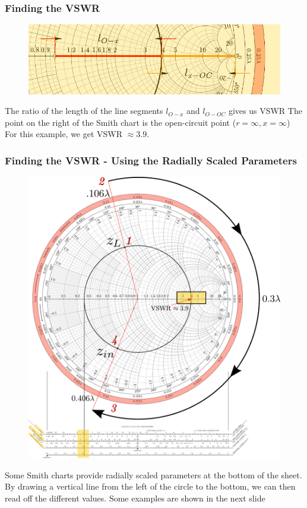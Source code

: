 \documentclass[10pt, compress]{beamer}
\begin{document}
\begin{frame}
    \frametitle{Finding the VSWR}
    \begin{figure}[T!]
        \centering
        \includegraphics[width=.95\textwidth]{smith example VSWR cropped.pdf}
    \end{figure}
    \begin{outline}
        \1 The ratio of the length of the line segments $l_{O - x}$ and $l_{O - OC}$ gives us VSWR
        \1 The point on the right of the Smith chart is the open-circuit point ($r = \infty, x = \infty$)
        \1 For this example, we get VSWR $\approx 3.9$.
    \end{outline}

\end{frame}

\begin{frame}
    \frametitle{Finding the VSWR - Using the Radially Scaled Parameters}
    \begin{figure}[T!]
        \centering
                \includegraphics[width=.50\textwidth]{smith example VSWR2.pdf}
    \end{figure}
    \begin{outline}
        \1 Some Smith charts provide radially scaled parameters at the bottom of the sheet.
        \1 By drawing a vertical line from the left of the circle to the bottom, we can then read off the different values.
        \1 Some examples are shown in the next slide
    \end{outline}
\end{frame}
\end{document}
